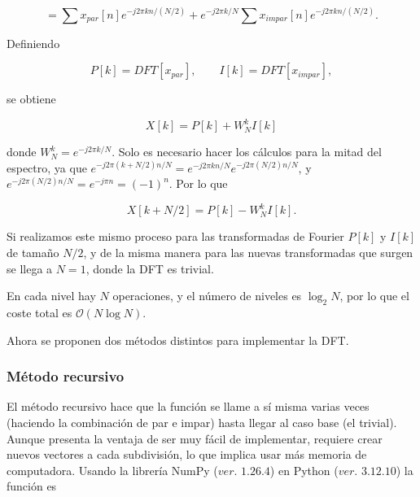 \documentclass[11pt,a4paper,twoside,pdf]{article}
\numberwithin{equation}{section}
\begin{document}
$$
    = \sum x_{par}[n] e^{-j2\pi kn / (N/2)} +
    e^{ -j2\pi k/N} \sum x_{impar}[n] e^{-j2\pi k n / (N/2)}.
$$

Definiendo

$$
    P[k] = DFT[x_{par}], \qquad I[k] = DFT[x_{impar}],
$$


se obtiene

$$
    X[k]=P[k]+W^k_N I[k]
$$

donde $W_N^k = e^{-j2\pi k/N}$. Solo es necesario hacer los cálculos para la mitad del espectro, ya que $e^{-j2\pi (k+N/2)n/N} = e^{-j2\pi kn/N} e^{-j2\pi (N/2)n/N}$, y $e^{-j2\pi (N/2)n/N} = e^{-j\pi n} = (-1)^n$. Por lo que

$$
    X[k + N/2] = P[k] - W^k_N I[k].
$$


Si realizamos este mismo proceso para las transformadas de Fourier $P[k]$ y $I[k]$ de tamaño $N/2$, y de la misma manera para las nuevas transformadas que surgen se llega a $N = 1$, donde la DFT es trivial.

En cada nivel hay $N$ operaciones, y el número de niveles es $\log_2 N$, por lo que el coste total es $\mathcal{O} (N \log N)$.

Ahora se proponen dos métodos distintos para implementar la DFT.



\subsubsection{Método recursivo}


El método recursivo hace que la función se llame a sí misma varias veces (haciendo la combinación de par e impar) hasta llegar al caso base (el trivial). Aunque presenta la ventaja de ser muy fácil de implementar, requiere crear nuevos vectores a cada subdivisión, lo que implica usar más memoria de computadora. Usando la librería NumPy ($ver.$ $1.26.4$) \cite{harris2020array} en Python ($ver.$ $3.12.10$) la función es\\
\end{document}
